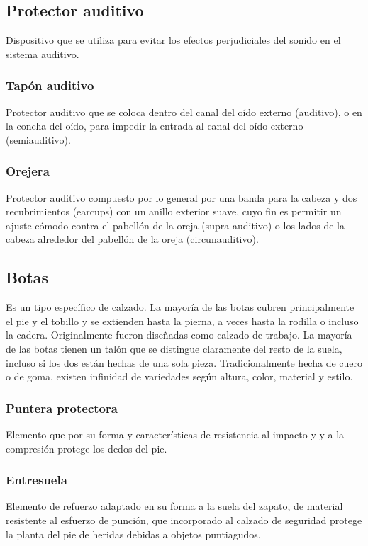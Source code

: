 \documentclass[12pt,graphicx,caption,rotating]{article}
\begin{document}
\subsection{Protector auditivo}
\noindent
Dispositivo que se utiliza para evitar los efectos perjudiciales del sonido en el sistema auditivo.\cite{ntc2272}

\subsubsection{Tapón auditivo}
\noindent
Protector auditivo que se coloca dentro del canal del oído externo (auditivo), o en la concha del oído, para impedir la entrada al canal del oído externo (semiauditivo).\cite{ntc2272}

\subsubsection{Orejera}
\noindent
Protector auditivo compuesto por lo general por una banda para la cabeza y dos recubrimientos (earcups) con un anillo exterior suave, cuyo fin es permitir un ajuste cómodo contra el pabellón de la oreja (supra-auditivo) o los lados de la cabeza alrededor del pabellón de la oreja (circunauditivo).\cite{ntc2272}

\subsection{Botas}
\noindent
Es un tipo específico de calzado. La mayoría de las botas cubren principalmente el pie y el tobillo y se extienden hasta la pierna, a veces hasta la rodilla o incluso la cadera. Originalmente fueron diseñadas como calzado de trabajo. La mayoría de las botas tienen un talón que se distingue claramente del resto de la suela, incluso si los dos están hechas de una sola pieza. Tradicionalmente hecha de cuero o de goma, existen infinidad de variedades según altura, color, material y estilo.

\subsubsection{Puntera protectora}
\noindent
Elemento que por su forma y características de resistencia al impacto y
y a la compresión protege los dedos del pie.\cite{ntc2257}

\subsubsection{Entresuela}
\noindent
Elemento de refuerzo adaptado en su forma a la suela del zapato, de material
resistente al esfuerzo de punción, que incorporado al calzado de seguridad protege la planta del
pie de heridas debidas a objetos puntiagudos.\cite{ntc2257}
\end{document}
